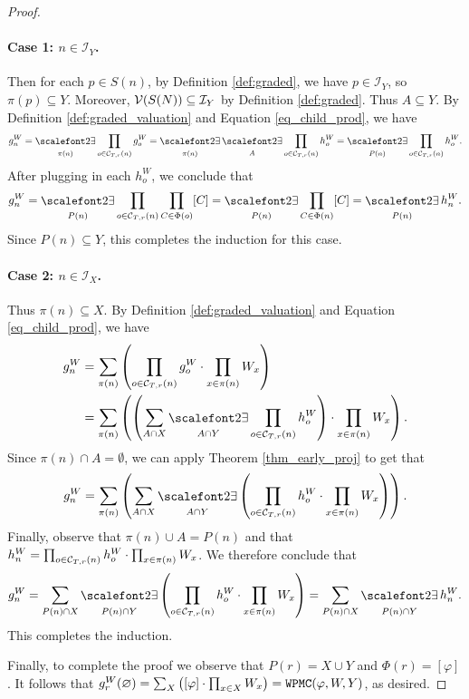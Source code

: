 \begin{proof}
\paragraph{Case 1: $n \in \mathcal{I}_Y$.} Then for each $p \in S(n)$, by Definition \ref{def:graded}, we have $p \in \mathcal{I}_Y$, so $\pi(p) \subseteq Y$. Moreover, $\mathcal{V}(S(N)) \subseteq \mathcal{I}_Y$ by Definition \ref{def:graded}. Thus $A \subseteq Y$. 
By Definition \ref{def:graded_valuation} and Equation \eqref{eq_child_prod}, we have
\begin{equation*}
    g^W_n = \displaystyle\exist_{\pi(n)} \prod_{o \in \C{T}{r}{n}} g^W_o = \displaystyle\exist_{\pi(n)} \displaystyle\exist_{A} \prod_{o \in \C{T}{r}{n}} h^W_o = \displaystyle\exist_{P(n)} \prod_{o \in \C{T}{r}{n}} h^W_o.
\end{equation*}
After plugging in each $h^W_o$, we conclude that $$g^W_n = \displaystyle\exist_{P(n)} \prod_{o \in \C{T}{r}{n}} \prod_{C \in \Phi(o)} [C] = \displaystyle\exist_{P(n)} \prod_{C \in \Phi(n)} [C] = \displaystyle\exist_{P(n)} h^W_n.$$
Since $P(n) \subseteq Y$, this completes the induction for this case.


\paragraph{Case 2: $n \in \mathcal{I}_X$.} Thus $\pi(n) \subseteq X$. 
By Definition \ref{def:graded_valuation} and Equation \eqref{eq_child_prod}, we have
\begin{align*}
    g^W_n 
    &= \displaystyle\sum_{\pi(n)} \pars{ \prod_{o \in \C T r n} g^W_o \cdot \prod_{x \in \pi(n)} W_x }\\ 
    &= \sum_{\pi(n)} \pars{ \pars{ \sum_{A \cap X} \displaystyle\exist_{A \cap Y} \prod_{o \in \C{T}{r}{n}} h^W_o } \cdot \prod_{x \in \pi(n)} W_x }.
\end{align*}
Since $\pi(n) \cap A = \emptyset$, we can apply Theorem \ref{thm_early_proj} to get that
\begin{equation*}
    g^W_n = \sum_{\pi(n)} \pars{ \sum_{A \cap X} \displaystyle\exist_{A \cap Y} \left( \prod_{o \in \C{T}{r}{n}} h^W_o \cdot \prod_{x \in \pi(n)} W_x \right) }.
\end{equation*}
Finally, observe that $\pi(n) \cup A = P(n)$ and that $h^W_n = \prod_{o \in \mathcal{C}_{T,r}(n)} h^W_o \cdot \prod_{x \in \pi(n)} W_x$. We therefore conclude that
\begin{equation*}
    g^W_n = \sum_{P(n) \cap X} \displaystyle\exist_{P(n) \cap Y} \left( \prod_{o \in \C{T}{r}{n}} h^W_o \cdot \prod_{x \in \pi(n)} W_x \right) =  \sum_{P(n) \cap X} \displaystyle\exist_{P(n) \cap Y} h^W_n.
\end{equation*}
This completes the induction.

Finally, to complete the proof we observe that $P(r) = X \cup Y$ and $\Phi(r) = [\varphi]$. It follows that $g^W_r(\varnothing) = \sum_X \left(  [\varphi] \cdot \prod_{x \in X} W_x  \right) = \texttt{\upshape WPMC}(\varphi, W, Y)$, as desired.
\end{proof}


